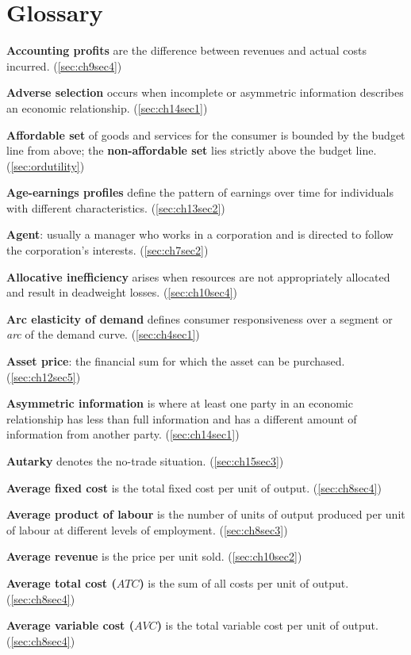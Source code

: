 \chapter*{Glossary}

\textbf{Accounting profits} are the difference between revenues and actual costs incurred. (\ref{sec:ch9sec4})

\textbf{Adverse selection} occurs when incomplete or asymmetric information describes an economic relationship. (\ref{sec:ch14sec1})

\textbf{Affordable set} of goods and services for the consumer is bounded by the budget line from above; the \textbf{non-affordable set} lies strictly above the budget line. (\ref{sec:ordutility})

\textbf{Age-earnings profiles} define the pattern of earnings over time for individuals with different characteristics. (\ref{sec:ch13sec2})

\textbf{Agent}: usually a manager who works in a corporation and is directed to follow the corporation's interests. (\ref{sec:ch7sec2})

\textbf{Allocative inefficiency} arises when resources are not appropriately allocated and result in deadweight losses. (\ref{sec:ch10sec4})

\textbf{Arc elasticity of demand} defines consumer responsiveness over a segment or \textit{arc} of the demand curve. (\ref{sec:ch4sec1})

\textbf{Asset price}: the financial sum for which the asset can be purchased. (\ref{sec:ch12sec5})

\textbf{Asymmetric information} is where at least one party in an economic relationship has less than full information and has a different amount of information from another party. (\ref{sec:ch14sec1})

\textbf{Autarky} denotes the no-trade situation. (\ref{sec:ch15sec3})

\textbf{Average fixed cost} is the total fixed cost per unit of output. (\ref{sec:ch8sec4})

\textbf{Average product of labour} is the number of units of output produced per unit of labour at different levels of employment. (\ref{sec:ch8sec3})

\textbf{Average revenue} is the price per unit sold. (\ref{sec:ch10sec2})

\textbf{Average total cost ($ATC$)} is the sum of all costs per unit of output. (\ref{sec:ch8sec4})

\textbf{Average variable cost ($AVC$)} is the total variable cost per unit of output. (\ref{sec:ch8sec4})

